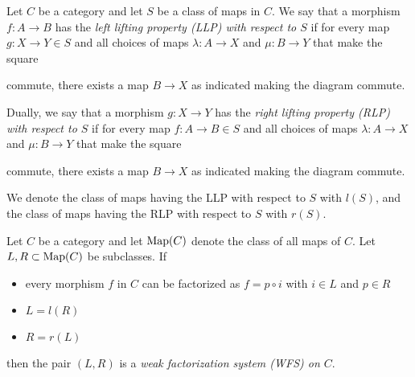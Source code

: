 \begin{definition}
    Let $C$ be a category and let $S$ be a class of maps in $C$.
    We say that a morphism $f\colon A\to B$ has the \emph{left lifting property (LLP) with respect to $S$} if for every map $g\colon X\to Y\in S$ and all choices of maps $\lambda\colon A\to X$ and $\mu\colon B\to Y$ that make the square
    \begin{center}
    \end{center}
    commute, there exists a map $B\to X$ as indicated making the diagram commute.

    Dually, we say that a morphism $g\colon X\to Y$ has the \emph{right lifting property (RLP) with respect to $S$} if for every map $f\colon A\to B\in S$ and all choices of maps $\lambda\colon A\to X$ and $\mu\colon B\to Y$ that make the square
    \begin{center}
    \end{center}
    commute, there exists a map $B\to X$ as indicated making the diagram commute.

    We denote the class of maps having the LLP with respect to $S$ with $l(S)$, and the class of maps having the RLP with respect to $S$ with $r(S)$.
\end{definition}
\begin{definition}
    Let $C$ be a category and let $\operatorname{Map}(C)$ denote the class of all maps of $C$.
    Let $L,R\subset\operatorname{Map}(C)$ be subclasses.
    If 
    \begin{itemize}
        \item every morphism $f$ in $C$ can be factorized as $f=p\circ i$ with $i\in L$ and $p\in R$
        \item $L=l(R)$
        \item $R=r(L)$
    \end{itemize}
    then the pair $(L,R)$ is a \emph{weak factorization system (WFS) on $C$}.
\end{definition}
